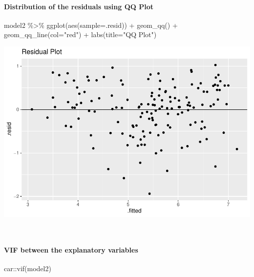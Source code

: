 \documentclass[
]{article}
\newenvironment{Shaded}{\begin{snugshade}}{\end{snugshade}}
\newcommand{\AttributeTok}[1]{\textcolor[rgb]{0.77,0.63,0.00}{#1}}
\newcommand{\FunctionTok}[1]{\textcolor[rgb]{0.00,0.00,0.00}{#1}}
\newcommand{\NormalTok}[1]{#1}
\newcommand{\SpecialCharTok}[1]{\textcolor[rgb]{0.00,0.00,0.00}{#1}}
\newcommand{\StringTok}[1]{\textcolor[rgb]{0.31,0.60,0.02}{#1}}
\begin{document}
\hypertarget{distribution-of-the-residuals-using-qq-plot}{%
\paragraph{Distribution of the residuals using QQ
Plot}\label{distribution-of-the-residuals-using-qq-plot}}

\begin{Shaded}
\begin{Highlighting}[]
\NormalTok{model2 }\SpecialCharTok{\%\textgreater{}\%} \FunctionTok{ggplot}\NormalTok{(}\FunctionTok{aes}\NormalTok{(}\AttributeTok{sample=}\NormalTok{.resid)) }\SpecialCharTok{+}
  \FunctionTok{geom\_qq}\NormalTok{() }\SpecialCharTok{+} \FunctionTok{geom\_qq\_line}\NormalTok{(}\AttributeTok{col=}\StringTok{"red"}\NormalTok{) }\SpecialCharTok{+}
  \FunctionTok{labs}\NormalTok{(}\AttributeTok{title=}\StringTok{"QQ Plot"}\NormalTok{)}
\end{Highlighting}
\end{Shaded}

\includegraphics{World-Happiness_files/figure-latex/unnamed-chunk-14-1.pdf}\\
\strut \\

\hypertarget{vif-between-the-explanatory-variables}{%
\paragraph{VIF between the explanatory
variables}\label{vif-between-the-explanatory-variables}}

\begin{Shaded}
\begin{Highlighting}[]
\NormalTok{car}\SpecialCharTok{::}\FunctionTok{vif}\NormalTok{(model2)}
\end{Highlighting}
\end{Shaded}
\end{document}
